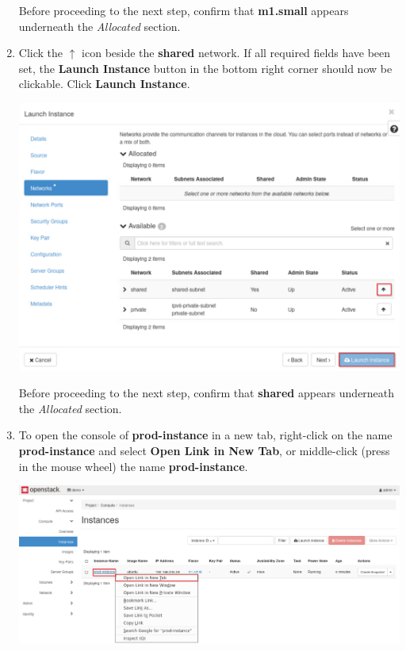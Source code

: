 \documentclass[letterpaper, 12pt]{article}
\begin{document}
\begin{enumerate}
    \begin{stopbox}
        Before proceeding to the next step, confirm that \textbf{m1.small} appears underneath the \textit{Allocated}
        section.
    \end{stopbox}

    \item Click the $\uparrow$ icon beside the \textbf{shared} network. If all required fields have been set, the
    \textbf{Launch Instance} button in the bottom right corner should now be clickable. Click \textbf{Launch Instance}.

    \begin{center}
        \includegraphics[width=\linewidth]{images/part1/step8.png}
    \end{center}

    \begin{stopbox}
        Before proceeding to the next step, confirm that \textbf{shared} appears underneath the \textit{Allocated}
        section.
    \end{stopbox}

    \item To open the console of \textbf{prod-instance} in a new tab, right-click on the name \textbf{prod-instance} and
    select \textbf{Open Link in New Tab}, or middle-click (press in the mouse wheel) the name \textbf{prod-instance}.

    \begin{center}
        \includegraphics[width=\linewidth]{images/part1/step9.png}
    \end{center}


\end{enumerate}
\end{document}
